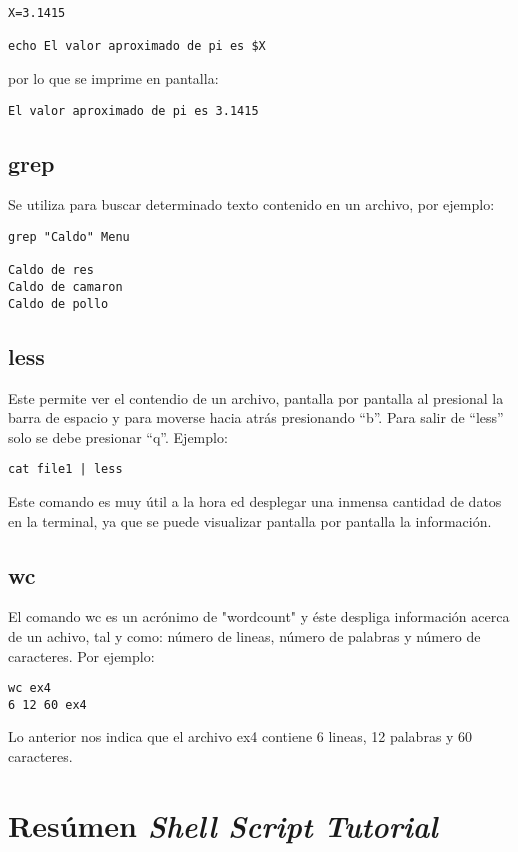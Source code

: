\documentclass[a4paper]{article}
\begin{document}
\begin{verbatim}
X=3.1415

echo El valor aproximado de pi es $X
\end{verbatim}
por lo que se imprime en pantalla:

\begin{verbatim}
El valor aproximado de pi es 3.1415
\end{verbatim}

\subsection{grep}

Se utiliza para buscar determinado texto contenido en un archivo, por ejemplo:

\begin{verbatim}
grep "Caldo" Menu

Caldo de res
Caldo de camaron
Caldo de pollo
\end{verbatim}

\subsection{less}
Este permite ver el contendio de un archivo, pantalla por pantalla al presional la barra de espacio y para moverse hacia atrás presionando “b”. Para salir de “less” solo se debe presionar “q”. Ejemplo:

\begin{verbatim}
cat file1 | less 
\end{verbatim}

Este comando es muy útil a la hora ed desplegar una inmensa cantidad de datos en la terminal, ya que se puede visualizar pantalla por pantalla la información.

\subsection{wc}

El comando wc es un acrónimo de "wordcount" y éste despliga información acerca de un achivo, tal y como: número de lineas, número de palabras y número de caracteres. Por ejemplo:

\begin{verbatim}
wc ex4
6 12 60 ex4
\end{verbatim}
Lo anterior nos indica que el archivo ex4 contiene 6 lineas, 12 palabras y 60 caracteres.

\section{Resúmen \textit{Shell Script Tutorial}}
\end{document}
